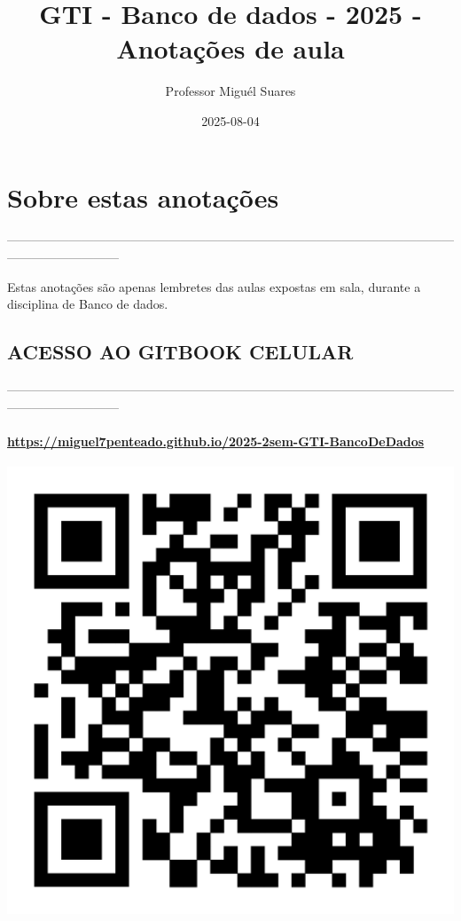 \documentclass[
]{book}
\title{GTI - Banco de dados - 2025 - Anotações de aula}
\author{Professor Miguél Suares}
\date{2025-08-04}
\begin{document}
\maketitle

{
\setcounter{tocdepth}{1}
\tableofcontents
}
\chapter*{Sobre estas anotações}\label{sobre-estas-anotauxe7uxf5es}

---------------------------------------------------------------------------------------------------------------------------------------

Estas anotações são apenas lembretes das aulas expostas em sala, durante a disciplina de Banco de dados.

\section{ACESSO AO GITBOOK CELULAR}\label{acesso-ao-gitbook-celular}

---------------------------------------------------------------------------------------------------------------------------------------

\subsubsection{\texorpdfstring{\url{https://miguel7penteado.github.io/2025-2sem-GTI-BancoDeDados}}{https://miguel7penteado.github.io/2025-2sem-GTI-BancoDeDados}}\label{httpsmiguel7penteado.github.io2025-2sem-gti-bancodedados}

\includegraphics{images/qr-code-disciplina.jpg}
\end{document}
